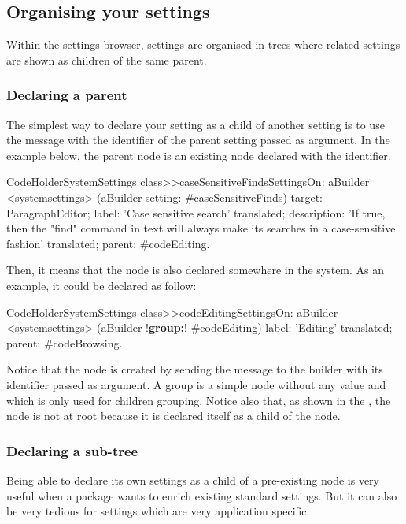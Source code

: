 \documentclass[a4paper,10pt,twoside]{book}
\begin{document}
\subsection{Organising your settings}

Within the settings browser, settings are organised in trees where related settings are shown as children of the same parent. 

\subsubsection{Declaring a parent}
The simplest way to declare your setting as a child of another setting is to use the  message with the identifier of the parent setting passed as argument. In the example below, the parent node is an existing node declared with the  identifier. 
\begin{code}{}
CodeHolderSystemSettings class>>caseSensitiveFindsSettingsOn: aBuilder
	<systemsettings>
	(aBuilder setting: #caseSensitiveFinds) 
		target: ParagraphEditor;
		label: 'Case sensitive search' translated;
		description: 'If true, then the "find" command in text will always make its searches in a case-sensitive fashion' translated;
		parent: #codeEditing.
\end{code}
Then, it means that the  node is also declared somewhere in the system. As an example, it could be declared as follow:
\begin{code}{}
CodeHolderSystemSettings class>>codeEditingSettingsOn: aBuilder
	<systemsettings>
	(aBuilder !\textbf{group:}! #codeEditing) 
		label: 'Editing' translated;
		parent: #codeBrowsing.
\end{code}
Notice that the  node is created by sending the  message to the builder with its identifier passed as argument. A group is a simple node without any value and which is only used for children grouping. Notice also that, as shown in the , the  node is not at root because it is declared itself as a child of the  node.

\subsubsection{Declaring a sub-tree}
Being able to declare its own settings as a child of a pre-existing node is very useful when a package wants to enrich existing standard settings. But it can also be very tedious for settings which are very application specific. 
\end{document}
